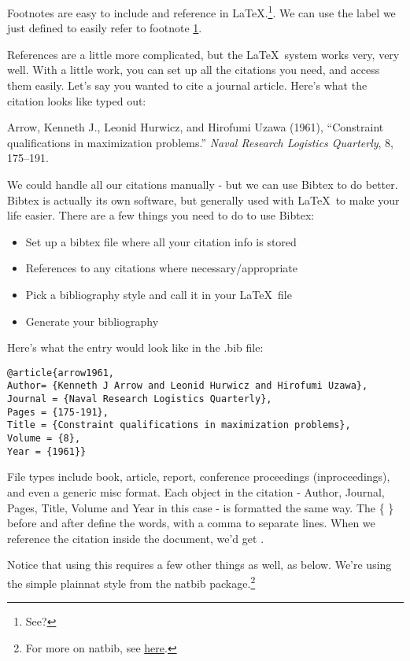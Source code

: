 \documentclass{article}
\begin{document}
Footnotes are easy to include and reference in \LaTeX.\footnote{See?\label{footnote}}. We can use the label we just defined to easily refer to footnote \ref{footnote}.

References are a little more complicated, but the \LaTeX\ system works very, very well. With a little work, you can set up all the citations you need, and access them easily. Let's say you wanted to cite a journal article. Here's what the citation looks like typed out:

Arrow, Kenneth J., Leonid Hurwicz, and Hirofumi Uzawa (1961), ``Constraint qualifications in maximization problems.'' \emph{Naval Research Logistics Quarterly}, 8, 175–191.

We could handle all our citations manually - but we can use Bibtex to do better. Bibtex is actually its own software, but generally used with \LaTeX\ to make your life easier. There are a few things you need to do to use Bibtex:
\begin{itemize}
	\item Set up a bibtex file where all your citation info is stored
	\item References to any citations where necessary/appropriate
	\item Pick a bibliography style and call it in your \LaTeX\ file
	\item Generate your bibliography
\end{itemize}

Here's what the entry would look like in the .bib file:
\begin{verbatim}
@article{arrow1961,
Author= {Kenneth J Arrow and Leonid Hurwicz and Hirofumi Uzawa},
Journal = {Naval Research Logistics Quarterly},
Pages = {175-191},
Title = {Constraint qualifications in maximization problems},
Volume = {8},
Year = {1961}}
\end{verbatim}

File types include book, article, report, conference proceedings (inproceedings), and even a generic misc format. Each object in the citation - Author, Journal, Pages, Title, Volume and Year in this case - is formatted the same way. The \{ \} before and after define the words, with a comma to separate lines. When we reference the citation inside the document, we'd get \citep{arrow1961}. 


Notice that using this requires a few other things as well, as below. We're using the simple plainnat style from the natbib package.\footnote{For more on natbib, see \href{https://www.sharelatex.com/learn/Natbib_bibliography_styles}{here}.} 
\end{document}
